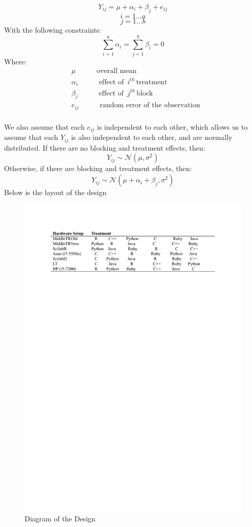 \documentclass[12pt,halfline,a4paper,]{ouparticle}
\begin{document}
\[
Y_{ij} = \mu + \alpha_i + \beta_j+ e_{ij}
\] \[
i = 1 ...a
\] \[
j = 1 ...b
\] With the following constraints: \[
\sum_{i=1}^a \alpha_i = \sum_{j=1}^b \beta_i =0 
\] Where: \[
\begin{aligned}
&\mu\hspace{35pt}  \text{overall mean} \\
&\alpha_i\hspace{35pt} \text{effect of }\, i^{th}\, \text{treatment}\\
&\beta_j\hspace{35pt} \text{effect of }\, j^{th}\, \text{block}\\
&e_{ij}\hspace{35pt} \text{random error of the observation}\\
\end{aligned}
\]

We also assume that each \(e_{ij}\) is independent to each other, which
allows us to assume that each \(Y_{ij}\) is also independent to each
other, and are normally distributed. If there are no blocking and
treatment effects, then: \[
Y_{ij} \sim \mathcal{N}(\mu, \sigma^2)
\] Otherwise, if there are blocking and treatment effects, then: \[
Y_{ij} \sim \mathcal{N}(\mu + \alpha_i + \beta_j, \sigma^2)
\] Below is the layout of the design

\begin{figure}[H]
\includegraphics[width=1\linewidth]{diagram} \caption{Diagram of the Design}\label{fig:unnamed-chunk-1}
\end{figure}
\newpage
\end{document}
